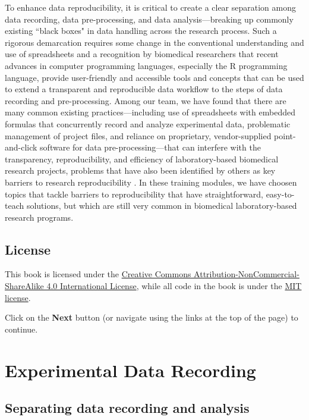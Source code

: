 \documentclass[]{tufte-book}
\begin{document}
To enhance data reproducibility, it is critical to create a clear separation
among data recording, data pre-processing, and data analysis---breaking up
commonly existing ``black boxes" in data handling across the research process.
Such a rigorous demarcation requires some change in the conventional
understanding and use of spreadsheets and a recognition by biomedical
researchers that recent advances in computer programming languages, especially
the R programming language, provide user-friendly and accessible tools and
concepts that can be used to extend a transparent and reproducible data workflow
to the steps of data recording and pre-processing. Among our team, we have found
that there are many common existing practices---including use of spreadsheets
with embedded formulas that concurrently record and analyze experimental data,
problematic management of project files, and reliance on proprietary,
vendor-supplied point-and-click software for data pre-processing---that can
interfere with the transparency, reproducibility, and efficiency of
laboratory-based biomedical research projects, problems that have also been
identified by others as key barriers to research reproducibility
\citep[ \citet{marwick2018packaging}]{broman2018data, bryan2018excuse, ellis2018share}. In
these training modules, we have choosen topics that tackle barriers to
reproducibility that have straightforward, easy-to-teach solutions, but which
are still very common in biomedical laboratory-based research programs.

\hypertarget{license}{%
\section{License}\label{license}}

This book is licensed under the \href{https://creativecommons.org/licenses/by-nc-sa/4.0/}{Creative Commons
Attribution-NonCommercial-ShareAlike 4.0 International
License}, while all code in
the book is under the \href{https://opensource.org/licenses/MIT}{MIT license}.

Click on the \textbf{Next} button (or navigate using the
links at the top of the page) to continue.

\hypertarget{experimental-data-recording}{%
\chapter{Experimental Data Recording}\label{experimental-data-recording}}

\hypertarget{separating-data-recording-and-analysis}{%
\section{Separating data recording and analysis}\label{separating-data-recording-and-analysis}}
\end{document}
